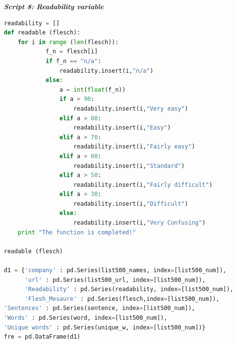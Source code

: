 \documentclass{article}
\begin{document}
\begin{center}
\textit{\textbf{Script 8: Readability variable}}\label{p8}
\end{center}
\begin{lstlisting}[language=Python]
readability = []
def readable (flesch):
    for i in range (len(flesch)):
            f_n = flesch[i]
            if f_n == "n/a":
                readability.insert(i,"n/a")                
            else:
                a = int(float(f_n))
                if a > 90:    
                    readability.insert(i,"Very easy")                    
                elif a > 80:
                    readability.insert(i,"Easy")
                elif a > 70:
                    readability.insert(i,"Fairly easy")
                elif a > 60:
                    readability.insert(i,"Standard")
                elif a > 50:
                    readability.insert(i,"Fairly difficult")
                elif a > 30:
                    readability.insert(i,"Difficult")
                else:
                    readability.insert(i,"Very Confusing")                    
    print "The function is completed!"

readable (flesch)

d1 = {'company' : pd.Series(list500_names, index=[list500_num]),
      'url' : pd.Series(list500_url, index=[list500_num]),
      'Readability' : pd.Series(readability, index=[list500_num]),
      'Flesh_Mesaure' : pd.Series(flesch,index=[list500_num]),
'Sentences' : pd.Series(sentence, index=[list500_num]),
'Words' : pd.Series(word, index=[list500_num]),
'Unique words' : pd.Series(unique_w, index=[list500_num])}
fre = pd.DataFrame(d1)    
\end{lstlisting}
\end{document}
